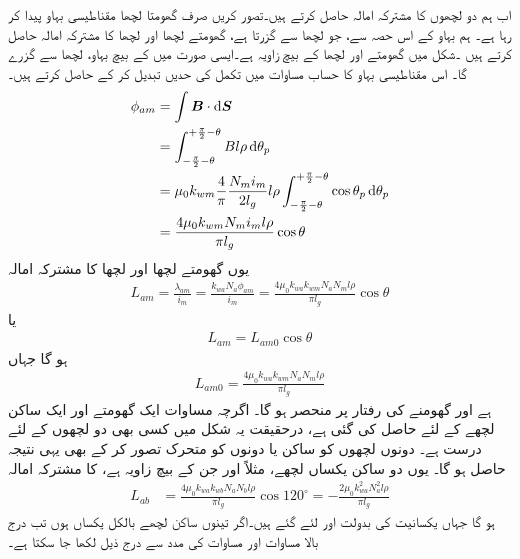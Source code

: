 اب ہم دو لچھوں کا مشترکہ امالہ حاصل کرتے ہیں۔تصور کریں صرف  گھومتا لچھا مقناطیسی بہاو پیدا کر رہا ہے۔ ہم  بہاو کے اس حصہ سے، جو  لچھا  سے گزرتا ہے، گھومتے لچھا اور  لچھا  کا مشترکہ امالہ حاصل کرتے ہیں ۔شکل   میں گھومتے اور  لچھا کے بیچ زاویہ  ہے۔ایسی صورت میں   کے بیچ بہاو،  لچھا سے گزرے گا۔ اس مقناطیسی بہاو کا حساب مساوات   میں تکمل کی حدیں تبدیل کر کے حاصل کرتے ہیں۔
\begin{gather}
\begin{aligned}
\phi_{am}&=\int \kvec{B} \cdot \dif \kvec{S}\\
&=\int_{-\frac{\pi}{2}-\theta}^{+\frac{\pi}{2}-\theta} B l \rho \dif \theta_p\\
&=\mu_0 k_{wm} \frac{4}{\pi}\frac{N_m i_m}{2 l_g} l \rho \int_{-\frac{\pi}{2}-\theta}^{+\frac{\pi}{2}-\theta} \cos \theta_p \dif \theta_p\\
&=\frac{4 \mu_0 k_{wm}  N_m i_m l \rho}{\pi l_g} \cos \theta
\end{aligned}
\end{gather}
یوں گھومتے لچھا اور  لچھا کا  مشترکہ امالہ
\begin{align}
L_{am}=\frac{\lambda_{am}}{i_m}=\frac{k_{wa} N_a \phi_{am}}{i_m}=\frac{4 \mu_0 k_{wa} k_{wm} N_a N_m l \rho}{\pi l_g} \cos \theta
\end{align}
یا
\begin{align}\label{مساوات_معاصر_ساکن_گھومتا_مشترکہ_امالہ}
L_{am}=L_{am0} \cos \theta
\end{align}
ہو گا جہاں
\begin{align}
L_{am0}=\frac{4 \mu_0 k_{wa} k_{wm} N_a N_m l \rho}{\pi l_g} 
\end{align}
ہے اور   گھومنے کی رفتار پر منحصر ہو گا۔ اگرچہ مساوات  ایک گھومتے اور ایک ساکن لچھے کے لئے حاصل کی گئی  ہے،  درحقیقت یہ  شکل  میں کسی بھی دو لچھوں کے لئے درست ہے۔  دونوں لچھوں کو ساکن یا دونوں کو متحرک تصور کر کے بھی یہی نتیجہ حاصل ہو گا۔  یوں  دو ساکن  یکساں لچھے، مثلاً  اور  جن کے بیچ   زاویہ ہے،  کا  مشترکہ امالہ
\begin{align}
L_{ab}&=\frac{4 \mu_0 k_{wa} k_{wb} N_a N_b l \rho}{\pi l_g} \cos 120^{\circ}=-\frac{2 \mu_0 k_{wa}^2  N_a^2 l \rho}{\pi l_g}
\end{align}
ہو گا جہاں یکسانیت کی  بدولت   اور  لئے گئے ہیں۔اگر تینوں ساکن لچھے بالکل یکساں ہوں  تب درج بالا مساوات اور مساوات  کی مدد سے درج ذیل  لکھا جا سکتا ہے۔ 
